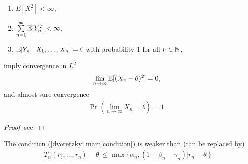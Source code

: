 \begin{thm}
\begin{enumerate}
        \item \(E[X_1^2]<\infty\),
        \item \(\sum\limits_{n=1}^\infty \mathbb{E}[Y_n^2]<\infty\),
        \item \(\mathbb{E}[Y_n\mid X_1,\dots,X_n]=0\) with probability 1 for all \(n\in\mathbb{N}\),
    \end{enumerate}
    imply convergence in \(L^2\)
    \begin{align}
        \lim_{n\to\infty} \mathbb{E}[(X_n-\theta)^2]=0,
    \end{align}
    and almost sure convergence
    \begin{align}
        \Pr(\lim_{n\to\infty} X_n=\theta)=1.
    \end{align}
\end{thm}
\begin{proof}
    see \textcite{dvoretzkyStochasticApproximation1956} 
\end{proof}
\begin{remark}
    The condition (\ref{dvoretzky: main condition}) is weaker than (can be replaced by)
    \begin{align}\label{dvoretzky: alt main cond}
        |T_n(r_1,\dots,r_n)-\theta|\le \max \{\alpha_n, (1+\beta_n -\gamma_n)|r_n-\theta|\}
    \end{align}
\end{remark}
